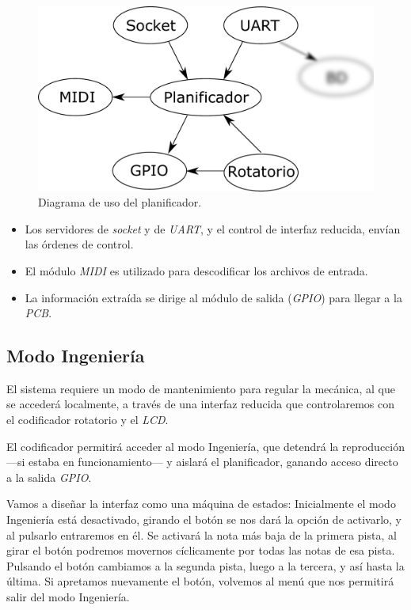 \begin{figure}[H]
	\noindent \begin{centering}
		\includegraphics[width=\linewidth/2]{capitulo4/daemon_scheduler}
		\par\end{centering}
	\smallskip
	\caption{\label{fig:daemon_scheduler} Diagrama de uso del planificador.}
\end{figure} 

\smallskip

\begin{itemize}
	\item Los servidores de \textit{socket} y de \textit{UART}, y el control de interfaz reducida, envían las órdenes de control.
	\item El módulo \textit{MIDI} es utilizado para descodificar los archivos de entrada.
	\item La información extraída se dirige al módulo de salida (\textit{GPIO}) para llegar a la \textit{PCB}.
\end{itemize}

\subsection{Modo Ingeniería}

El sistema requiere un modo de mantenimiento para regular la mecánica, al que se accederá localmente, a través de una interfaz reducida que controlaremos con el codificador rotatorio y el \textit{LCD}.

El codificador permitirá acceder al modo Ingeniería, que detendrá la reproducción ---si estaba en funcionamiento--- y  aislará el planificador, ganando acceso directo a la salida \textit{GPIO}.

Vamos a diseñar la interfaz como una máquina de estados: Inicialmente el modo Ingeniería está desactivado, girando el botón se nos dará la opción de activarlo, y al pulsarlo entraremos en él. Se activará la nota más baja de la primera pista, al girar el botón podremos movernos cíclicamente por todas las notas de esa pista. Pulsando el botón cambiamos a la segunda pista, luego a la tercera, y así hasta la última. Si apretamos nuevamente el botón, volvemos al menú que nos permitirá salir del modo Ingeniería.

